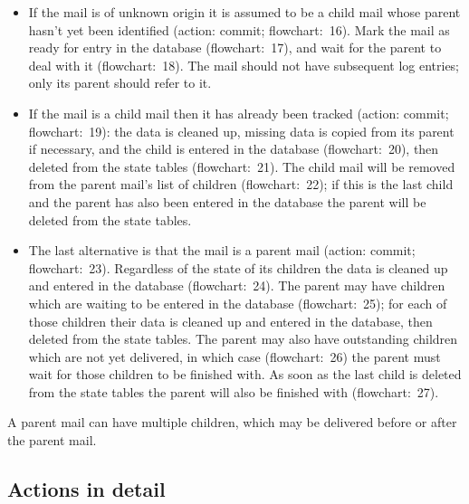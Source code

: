 \documentclass[a4paper,12pt,draft]{article}
\begin{document}
\begin{itemize}

    \item If the mail is of unknown origin it is assumed to be a child mail
        whose parent hasn't yet been identified (action: commit;
        flowchart:~16).  Mark the mail as ready for entry in the database
        (flowchart:~17), and wait for the parent to deal with it
        (flowchart:~18).  The mail should not have subsequent log entries;
        only its parent should refer to it.

    \item If the mail is a child mail then it has already been tracked
        (action: commit; flowchart:~19): the data is cleaned up, missing
        data is copied from its parent if necessary, and the child is
        entered in the database (flowchart:~20), then deleted from the
        state tables (flowchart:~21).  The child mail will be removed from
        the parent mail's list of children (flowchart:~22); if this is the
        last child and the parent has also been entered in the database the
        parent will be deleted from the state tables.

    \item The last alternative is that the mail is a parent mail (action:
        commit; flowchart:~23).  Regardless of the state of its children
        the data is cleaned up and entered in the database (flowchart:~24).
        The parent may have children which are waiting to be entered in the
        database (flowchart:~25); for each of those children their data is
        cleaned up and entered in the database, then deleted from the state
        tables.  The parent may also have outstanding children which are
        not yet delivered, in which case (flowchart:~26) the parent must
        wait for those children to be finished with.  As soon as the last
        child is deleted from the state tables the parent will also be
        finished with (flowchart:~27).

\end{itemize}

A parent mail can have multiple children, which may be delivered before or
after the parent mail.  

\subsection{Actions in detail}

\label{actions-in-detail}
\end{document}
